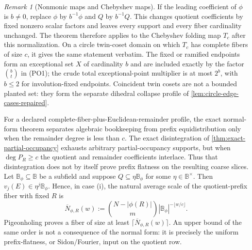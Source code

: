 \documentclass[12pt,a4paper]{amsart}
\numberwithin{equation}{section}
\theoremstyle{remark}
\newtheorem{remark}[remark]{Remark}
\newcommand{\B}{\mathbb B}
\begin{document}
\begin{remark}[Nonmonic maps and Chebyshev maps]
\label{rem:qr-chebyshev}
If the leading coefficient of $\phi$ is $b\ne0$, replace $\phi$ by
$b^{-1}\phi$ and $Q$ by $b^{-1}Q$.  This changes quotient coefficients by
fixed nonzero scalar factors and leaves every support and every fiber
cardinality unchanged.  The theorem therefore applies to the Chebyshev
folding map $T_c$ after this normalization.  On a circle twin-coset domain
on which $T_c$ has complete fibers of size $c$, it gives the same statement
verbatim.  The fixed or ramified endpoints form an exceptional set \(X\)
of cardinality \(b\) and are included exactly by the factor \(\binom bt\)
in \textup{(PO1)}; the crude total exceptional-point multiplier is at most
\(2^b\), with \(b\le2\) for involution-fixed endpoints.  Coincident twin
cosets are not a bounded planted set: they form the separate dihedral
collapse profile of \cref{lem:circle-edge-cases-repaired}.
\end{remark}

For a declared complete-fiber-plus-Euclidean-remainder profile, the exact
normal-form theorem separates algebraic bookkeeping from prefix
equidistribution only when the remainder degree is less than \(c\).  The
exact disintegration of \cref{thm:exact-partial-occupancy} exhausts
arbitrary partial-occupancy supports, but when \(\deg P_R\ge c\) the
quotient and remainder coefficients interlace.  Thus that disintegration
does not by itself prove prefix flatness on the resulting coarse slices.
Let
$\B_\phi\subseteq\B$ be a subfield and suppose
\(Q\subseteq\eta\B_\phi\) for some $\eta\in\B^\times$.  Then
\(v_j(E)\in\eta^j\B_\phi\).  Hence, in case
\textup{(i)}, the natural average scale of the quotient-prefix fiber with
fixed $R$ is
\[
 \overline N_{\phi,R}(w)
 :=\binom{N-|\phi(R)|}{m}
       |\B_\phi|^{-\lfloor w/c\rfloor}.             \tag{QR6}\label{eq:qr-natural-scale}
\]
Pigeonholing proves a fiber of size at least
\(\lceil\overline N_{\phi,R}(w)\rceil\).  An upper bound of the same order
is not a consequence of the normal form: it is precisely the uniform
prefix-flatness, or Sidon/Fourier, input on the quotient row.
\end{document}
